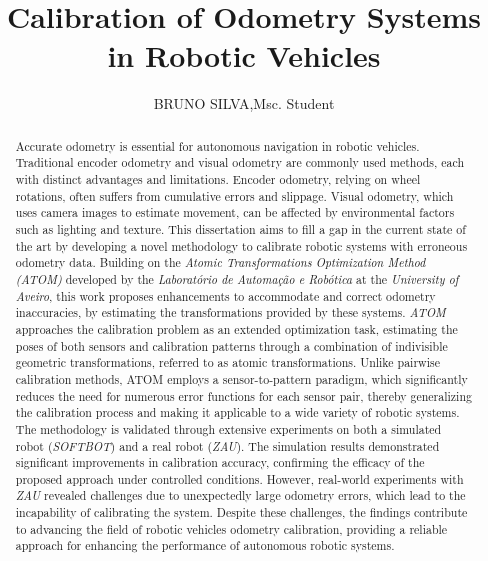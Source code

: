 \documentclass{ieeeaccess}
\begin{document}

\title{Calibration of Odometry Systems in Robotic Vehicles}
\author{\uppercase{Bruno Silva},Msc. Student}

\address[1]{Department of Electronics, Telecommunications, and Informatics, University of Aveiro}



\begin{abstract}
Accurate odometry is essential for autonomous navigation in robotic vehicles. Traditional encoder odometry and
visual odometry are commonly used methods, each with distinct advantages and limitations. Encoder odometry,
relying on wheel rotations, often suffers from cumulative errors and slippage. Visual odometry, which uses
camera images to estimate movement, can be affected by environmental factors such as lighting and texture.
This dissertation aims to fill a gap in the current state of the art by developing a novel methodology to calibrate
robotic systems with erroneous odometry data. Building on the \textit{Atomic Transformations Optimization Method
(ATOM)} developed by the \textit{Laboratório de Automação e Robótica} at the \textit{University of Aveiro}, this work proposes
enhancements to accommodate and correct odometry inaccuracies, by estimating the transformations provided by
these systems.
\textit{ATOM} approaches the calibration problem as an extended optimization task, estimating the poses of both sensors
and calibration patterns through a combination of indivisible geometric transformations, referred to as atomic
transformations. Unlike pairwise calibration methods, ATOM employs a sensor-to-pattern paradigm, which
significantly reduces the need for numerous error functions for each sensor pair, thereby generalizing the
calibration process and making it applicable to a wide variety of robotic systems.
The methodology is validated through extensive experiments on both a simulated robot (\textit{SOFTBOT}) and a real
robot (\textit{ZAU}). The simulation results demonstrated significant improvements in calibration accuracy, confirming the efficacy of the proposed approach under controlled conditions. However, real-world
experiments with \textit{ZAU} revealed challenges due to unexpectedly large odometry errors, which lead to the
incapability of calibrating the system. Despite these challenges, the findings contribute to advancing the field of robotic
vehicles odometry
calibration, providing a reliable approach for enhancing the performance of autonomous robotic systems.
\end{abstract}
\end{document}
